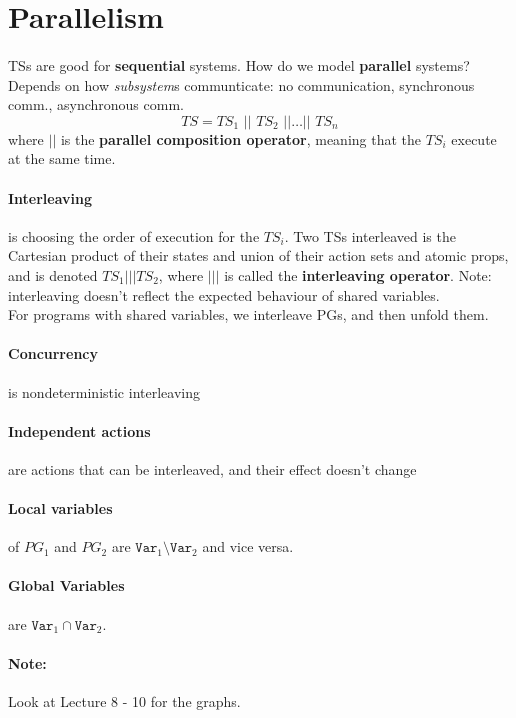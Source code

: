 \documentclass{article}
\begin{document}
\section{Parallelism}
\paragraph{}
TSs are good for \textbf{sequential} systems.
How do we model \textbf{parallel} systems?
Depends on how \textit{subsystem}s communticate: no communication, synchronous
comm., asynchronous comm.
\[
  TS = TS_1 \,\,||\,\, TS_2 \,\,|| \hdots ||\,\,TS_n
\]
where $||$ is the \textbf{parallel composition operator}, meaning that the
$TS_i$ execute at the same time.

\paragraph{Interleaving} is choosing the order of execution for the $TS_i$. Two
TSs interleaved is the Cartesian product of their states and union of their
action sets and atomic props, and is denoted $TS_1 ||| TS_2$, where $|||$ is
called the \textbf{interleaving operator}. Note: interleaving doesn't reflect
the expected behaviour of shared variables.\\
For programs with shared variables, we interleave PGs, and then unfold them.
\paragraph{Concurrency} is nondeterministic interleaving
\paragraph{Independent actions} are actions that can be interleaved, and their
effect doesn't change
\paragraph{Local variables} of $PG_1$ and $PG_2$ are $\texttt{Var}_1 \setminus
\texttt{Var}_2$ and vice versa.
\paragraph{Global Variables} are $\texttt{Var}_1 \cap
\texttt{Var}_2$.

\paragraph{Note:} Look at Lecture 8 - 10 for the graphs.
\end{document}
